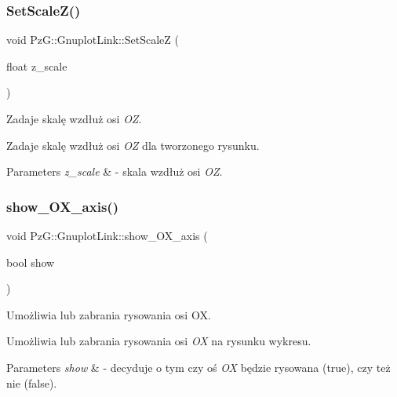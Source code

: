 \subsubsection{\texorpdfstring{Set\+Scale\+Z()}{SetScaleZ()}}
{\footnotesize\ttfamily void Pz\+G\+::\+Gnuplot\+Link\+::\+Set\+ScaleZ (\begin{DoxyParamCaption}\item[{float}]{z\+\_\+scale }\end{DoxyParamCaption})\hspace{0.3cm}{\ttfamily [inline]}}



Zadaje skalę wzdłuż osi {\itshape OZ}. 

Zadaje skalę wzdłuż osi {\itshape OZ} dla tworzonego rysunku. 
\begin{DoxyParams}{Parameters}
{\em z\+\_\+scale} & -\/ skala wzdłuż osi {\itshape OZ}. \\
\hline
\end{DoxyParams}
\mbox{\label{class_pz_g_1_1_gnuplot_link_abd99d3a72eebe5c6323be5cf4a465b34}} 
\subsubsection{\texorpdfstring{show\+\_\+\+O\+X\+\_\+axis()}{show\_OX\_axis()}\hspace{0.1cm}{\footnotesize\ttfamily [1/2]}}
{\footnotesize\ttfamily void Pz\+G\+::\+Gnuplot\+Link\+::show\+\_\+\+O\+X\+\_\+axis (\begin{DoxyParamCaption}\item[{bool}]{show }\end{DoxyParamCaption})\hspace{0.3cm}{\ttfamily [inline]}}



Umożliwia lub zabrania rysowania osi OX. 

Umożliwia lub zabrania rysowania osi {\itshape OX} na rysunku wykresu. 
\begin{DoxyParams}{Parameters}
{\em show} & -\/ decyduje o tym czy oś {\itshape OX} będzie rysowana ({\ttfamily true}), czy też nie ({\ttfamily false}). \\
\hline
\end{DoxyParams}
\mbox{\label{class_pz_g_1_1_gnuplot_link_a43c8b059bbfff0addbe7ab62760c242b}} 
